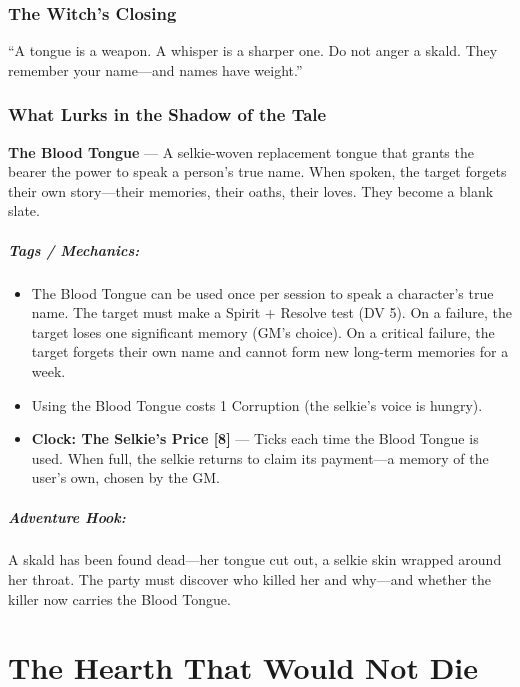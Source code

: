 \documentclass[9pt,a5paper]{extbook}
\begin{document}
\subsection*{The Witch's Closing}

``A tongue is a weapon. A whisper is a sharper one. Do not anger a skald. They remember your name---and names have weight.''

\subsection*{What Lurks in the Shadow of the Tale}

\textbf{The Blood Tongue} --- A selkie-woven replacement tongue that grants the bearer the power to speak a person's true name. When spoken, the target forgets their own story---their memories, their oaths, their loves. They become a blank slate.

\paragraph{Tags / Mechanics:}
\begin{itemize}
    \item The Blood Tongue can be used once per session to speak a character's true name. The target must make a Spirit + Resolve test (DV 5). On a failure, the target loses one significant memory (GM's choice). On a critical failure, the target forgets their own name and cannot form new long-term memories for a week.
    \item Using the Blood Tongue costs 1 Corruption (the selkie's voice is hungry).
    \item \textbf{Clock: The Selkie's Price [8]} --- Ticks each time the Blood Tongue is used. When full, the selkie returns to claim its payment---a memory of the user's own, chosen by the GM.
\end{itemize}

\paragraph{Adventure Hook:}
A skald has been found dead---her tongue cut out, a selkie skin wrapped around her throat. The party must discover who killed her and why---and whether the killer now carries the Blood Tongue.

\clearpage

\chapter{The Hearth That Would Not Die}
\end{document}
